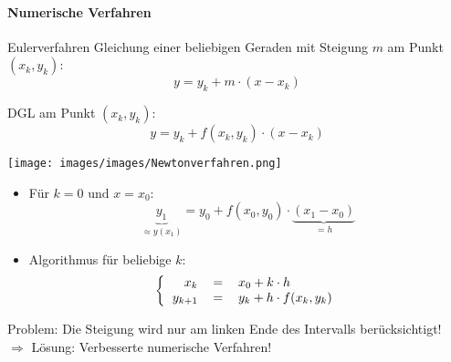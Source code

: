 \paragraph{Numerische Verfahren}
\begin{definition}{Eulerverfahren}
  Gleichung einer beliebigen Geraden mit Steigung \(m\) am Punkt \((x_k,y_k)\):
      \[y=y_k+m\cdot(x-x_k)\]
    \begin{minipage}{0.5\linewidth}
      DGL am Punkt \((x_k,y_k)\):
      \[y=y_k+f(x_k,y_k)\cdot (x-x_k)\]
    \end{minipage}
    \begin{minipage}{0.45\linewidth}
      \begin{center}
        \texttt{[image: images/images/Newtonverfahren.png]}
        \end{center}
    \end{minipage}
  \begin{itemize}

    \item Für \(k=0 \text{ und } x=x_0\):
      \[\underbrace{y_1}_{\approx y(x_1)}=y_0+f(x_0,y_0)\cdot\underbrace{(x_1-x_0)}_{=h}\]
    \item Algorithmus für beliebige \(k\):
      \[\left\{\begin{tabular}{rcl}
	  \(x_k\)&\(=\)&\(x_0+k\cdot h\)\\
	  \(y_{k+1}\)&\(=\)&\(y_k+h\cdot f(x_k,y_k)\)
	\end{tabular}
      \right.\]
  \end{itemize}
  Problem: Die Steigung wird nur am linken Ende des Intervalls berücksichtigt!
    \\ $\Rightarrow$ Lösung: Verbesserte numerische Verfahren!
\end{definition}
